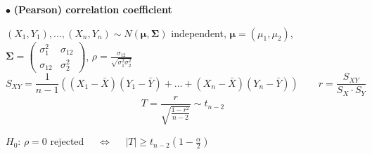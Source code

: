 \documentclass[twoside]{book}
\begin{document}
\pagestyle{empty}

\def\dr #1{\par\noindent $\bullet$ {\bf #1}}

\dr{(Pearson) correlation coefficient}
\vspace*{2mm}
\par $(X_{1},Y_{1}),\dots,(X_{n},Y_{n})\sim N(\boldsymbol\mu,\boldsymbol\Sigma)$ independent, $\boldsymbol\mu=(\mu_1,\mu_2)$,  $\boldsymbol\Sigma=\begin{pmatrix}\sigma_1^2 & \sigma_{12}\\ \sigma_{12} & \sigma_2^2\end{pmatrix}$,
$\displaystyle{\rho=\frac{\sigma_{12}}{\sqrt{\sigma_1^2\sigma_2^2}}}$
\vspace*{4mm}
$$ S_{XY}=\frac1{n-1}\left((X_1-\bar{X})(Y_1-\bar{Y}) + \dots + (X_{n}-\bar{X})(Y_{n}-\bar{Y})\right)
\qquad r=\frac{S_{XY}}{S_{X}\cdot S_{Y}}$$
$$T=\frac{r}{\sqrt{\frac{1-r^2}{n-2}}}\sim t_{n-2}$$
\vspace*{3mm}
\par $H_0$:  $\rho=0$ rejected $\quad\Longleftrightarrow\quad$  $ |T|\geq t_{n-2}(1-\frac{\alpha}2)$
\end{document}

